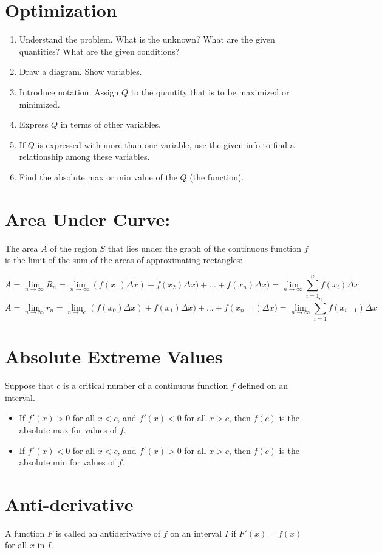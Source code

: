 \documentclass[12pt]{article}
\begin{document}
\section{Optimization} 
\begin{enumerate}
    \item Understand the problem. What is the unknown? What are the given quantities? What are the given conditions?
    \item Draw a diagram.  Show variables.
    \item Introduce notation. Assign $Q$ to the quantity that is to be maximized or minimized.
    \item Express $Q$ in terms of other variables.
    \item If $Q$ is expressed with more than one variable, use the given info to find a relationship among these variables.
    \item Find the absolute max or min value of the $Q$ (the function). 
\end{enumerate}


\section{Area Under Curve: } The area $A$ of the region $S$ that lies under the graph of the continuous function $f$ is the limit of the sum of the areas of approximating rectangles:

$$A=\lim_{n\to \infty} R_n = \lim_{n\to \infty} (f(x_1)\Delta x) + f(x_2)\Delta x) + ... + f(x_n)\Delta x) = \lim_{n\to \infty} \sum_{i=1}^{n} f(x_i)\Delta x$$
$$A=\lim_{n\to \infty} r_n = \lim_{n\to \infty} (f(x_0)\Delta x) + f(x_1)\Delta x) + ... + f(x_{n-1})\Delta x)= \lim_{n\to \infty} \sum_{i=1}^{n} f(x_{i-1})\Delta x$$

\section{Absolute Extreme Values} Suppose that $c$ is a critical number of a continuous function $f$ defined on an interval. 
\begin{itemize}
    \item If $f'(x)>0$ for all $x<c$, and $f'(x)<0$ for all $x>c$, then $f(c)$ is the absolute max for values of $f$.
    \item If $f'(x)<0$ for all $x<c$, and $f'(x)>0$ for all $x>c$, then $f(c)$ is the absolute min for values of $f$.
\end{itemize}

\section{Anti-derivative}
A function $F$ is called an antiderivative of $f$ on an interval $I$ if $F'(x) = f(x)$ for all $x$ in $I$.
\end{document}
